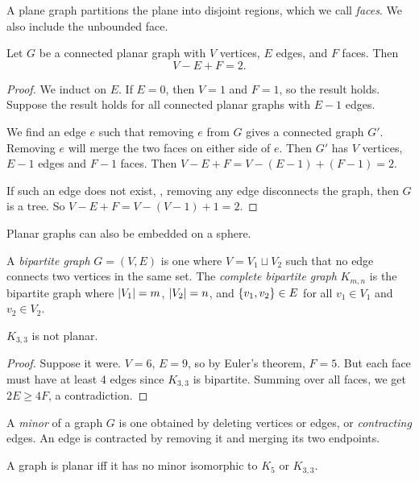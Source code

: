 \begin{theorem} \label{thm:planar_graphs:jordan}
    A plane graph partitions the plane into disjoint regions, which we call
    \emph{faces}.
    We also include the unbounded face.
\end{theorem}
\begin{theorem*} \label{thm:planar_graphs:euler}
    Let $G$ be a connected planar graph with $V$ vertices, $E$ edges,
    and $F$ faces.
    Then \[
        V - E + F = 2.
    \]
\end{theorem*}
\begin{proof}
    We induct on $E$.
    If $E = 0$, then $V = 1$ and $F = 1$, so the result holds.
    Suppose the result holds for all connected planar graphs with $E - 1$
    edges.

    We find an edge $e$ such that removing $e$ from $G$ gives a connected
    graph $G'$.
    Removing $e$ will merge the two faces on either side of $e$.
    Then $G'$ has $V$ vertices, $E - 1$ edges and $F - 1$ faces.
    Then $V - E + F = V - (E-1) + (F-1) = 2$.

    If such an edge does not exist, \ie, removing any edge disconnects the
    graph, then $G$ is a tree.
    So $V - E + F = V - (V - 1) + 1 = 2$.
\end{proof}
\begin{remark}
    Planar graphs can also be embedded on a sphere.
\end{remark}

\begin{definition}  \label{def:planar_graphs:bipartite}
    A \emph{bipartite graph} $G = (V, E)$ is one where
    $V = V_1 \sqcup V_2$ such that no edge connects two vertices in the same
    set.
    The \emph{complete bipartite graph} $K_{m,n}$ is the bipartite graph
    where $\abs{V_1} = m$, $\abs{V_2} = n$, and $\set{v_1, v_2} \in E$ for
    all $v_1 \in V_1$ and $v_2 \in V_2$.
\end{definition}
\begin{corollary}
    $K_{3, 3}$ is not planar.
\end{corollary}
\begin{proof}
    Suppose it were.
    $V = 6$, $E = 9$, so by Euler's theorem, $F = 5$.
    But each face must have at least 4 edges since $K_{3, 3}$ is bipartite.
    Summing over all faces, we get $2E \geq 4F$, a contradiction.
\end{proof}

\begin{definition}[Minor] \label{def:planar_graphs:minor}
    A \emph{minor} of a graph $G$ is one obtained by deleting vertices or
    edges, or \emph{contracting} edges.
    An edge is contracted by removing it and merging its two endpoints.
\end{definition}
\begin{fact*} \label{thm:planar_graphs:kuratowski}
    A graph is planar iff it has no minor isomorphic to $K_5$ or $K_{3,3}$.
\end{fact*}

